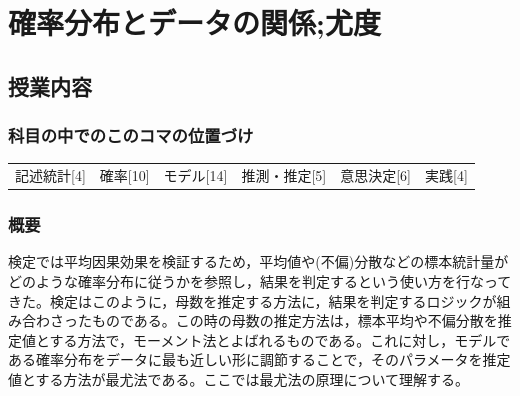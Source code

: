 \section{確率分布とデータの関係;尤度}
\label{lesson23}

\subsection{授業内容}
\subsubsection{科目の中でのこのコマの位置づけ}
\begin{tabular}[t]{cccccc}
    記述統計[4] & 確率[10] & モデル[14] & 推測・推定[5] & 意思決定[6] & 実践[4]
\end{tabular}

\subsubsection{概要}
検定では平均因果効果を検証するため，平均値や(不偏)分散などの標本統計量がどのような確率分布に従うかを参照し，結果を判定するという使い方を行なってきた。検定はこのように，母数を推定する方法に，結果を判定するロジックが組み合わさったものである。この時の母数の推定方法は，標本平均や不偏分散を推定値とする方法で，モーメント法とよばれるものである。これに対し，モデルである確率分布をデータに最も近しい形に調節することで，そのパラメータを推定値とする方法が最尤法である。ここでは最尤法の原理について理解する。
